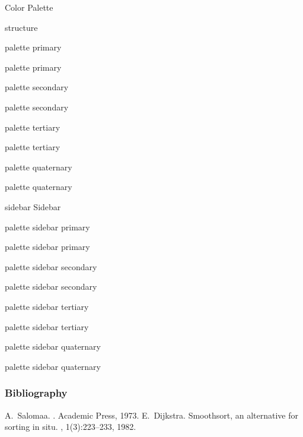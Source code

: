 \documentclass[11pt]{khbeamerho}
\begin{document}
\begin{frame}{Color Palette}

\textcolor{structure}{structure}

\begin{minipage}{10em}
	\begin{beamercolorbox}{palette primary}
	\strut palette primary
	\end{beamercolorbox}

	\begin{beamercolorbox}{palette secondary}
	\strut palette secondary
	\end{beamercolorbox}

	\begin{beamercolorbox}{palette tertiary}
	\strut palette tertiary
	\end{beamercolorbox}

	\begin{beamercolorbox}{palette quaternary}
	\strut palette quaternary
	\end{beamercolorbox}
\end{minipage}

\begin{minipage}{12em}
\small
\begin{beamercolorbox}{sidebar}
	Sidebar

	\begin{beamercolorbox}{palette sidebar primary}
	\strut palette sidebar primary
	\end{beamercolorbox}

	\begin{beamercolorbox}{palette sidebar secondary}
	\strut palette sidebar secondary
	\end{beamercolorbox}

	\begin{beamercolorbox}{palette sidebar tertiary}
	\strut palette sidebar tertiary
	\end{beamercolorbox}

	\begin{beamercolorbox}{palette sidebar quaternary}
	\strut palette sidebar quaternary
	\end{beamercolorbox}
\end{beamercolorbox}
\end{minipage}
\end{frame}


\begin{frame}
\frametitle{Bibliography}
\begin{thebibliography}{Dijkstra, 1982}
A.~Salomaa.
.
\newblock Academic Press, 1973.
E.~Dijkstra.
\newblock Smoothsort, an alternative for sorting in situ.
, 1(3):223--233, 1982.
\end{thebibliography}
\end{frame}
\end{document}

